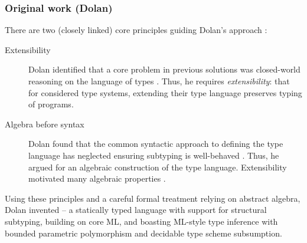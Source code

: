 \needspace{5em}
\subsubsection{Original work (Dolan)}
\label{subsubsec:dolan}

There are two (closely linked) core principles guiding Dolan's approach \cite[Section~1.3]{dolan-thesis}: \begin{description}
    \item[Extensibility] Dolan identified that a core problem in previous solutions was closed-world reasoning on the language of types \cite[Section~1.3.1]{dolan-thesis}. Thus, he requires \emph{extensibility}: that for considered type systems, extending their type language preserves typing of programs.
    \item[Algebra before syntax] Dolan found that the common syntactic approach to defining the type language has neglected ensuring subtyping is well-behaved \cite[Section~1.3.2]{dolan-thesis}. Thus, he argued for an algebraic construction of the type language. Extensibility motivated many algebraic properties \cite[Section~2.1.5]{dolan-thesis}.
\end{description}
Using these principles and a careful formal treatment relying on abstract algebra, Dolan invented \mlsub{} -- a statically typed language with support for structural subtyping, building on core ML, and boasting ML-style type inference with bounded parametric polymorphism and decidable type scheme subsumption.

